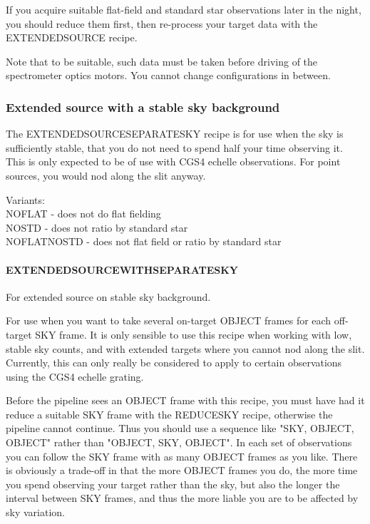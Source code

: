 \documentclass[twoside,11pt]{article}
\renewcommand{\_}{\texttt{\symbol{95}}}
\begin{document}
If you acquire suitable flat-field and standard star observations later
in the night, you should reduce them first, then re-process your
target data with the EXTENDED\_SOURCE recipe.



Note that to be suitable, such data must be taken before driving
of the spectrometer optics motors. You cannot change configurations
in between.


\subsubsection{Extended source with a stable sky background}

The EXTENDED\_SOURCE\_SEPARATE\_SKY recipe is for use when the sky is
sufficiently stable, that you do not need to spend half your time
observing it. This is only expected to be of use with CGS4 echelle
observations. For point sources, you would nod along the slit anyway.

Variants: \\
\_NOFLAT - does not do flat fielding \\
\_NOSTD - does not ratio by standard star \\
\_NOFLAT\_NOSTD - does not flat field or ratio by standard star \\

\paragraph{EXTENDED\_SOURCE\_WITH\_SEPARATE\_SKY\label{EXTENDED_SOURCE_WITH_SEPARATE_SKY}}


For extended source on stable sky background.


\mbox{}


For use when you want to take several on-target OBJECT frames for each
off-target SKY frame. It is only sensible to use this recipe when
working with low, stable sky counts, and with extended targets where
you cannot nod along the slit. Currently, this can only really be
considered to apply to certain observations using the CGS4 echelle
grating.



Before the pipeline sees an OBJECT frame with this recipe, you must
have had it reduce a suitable SKY frame with the REDUCE\_SKY recipe,
otherwise the pipeline cannot continue. Thus you should use a sequence
like "SKY, OBJECT, OBJECT" rather than "OBJECT, SKY, OBJECT". In each
set of observations you can follow the SKY frame with as many OBJECT
frames as you like. There is obviously a trade-off in that the more
OBJECT frames you do, the more time you spend observing your target
rather than the sky, but also the longer the interval between SKY
frames, and thus the more liable you are to be affected by sky
variation.
\end{document}
